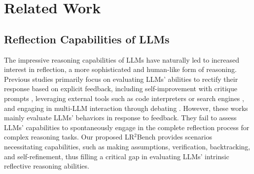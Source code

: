 \section{Related Work}
\subsection{Reflection Capabilities of LLMs}
The impressive reasoning capabilities of LLMs have naturally led to increased interest in reflection, a more sophisticated and human-like form of reasoning. Previous studies primarily focus on evaluating LLMs' abilities to rectify their response based on explicit feedback, including self-improvement with critique prompts \citep{lan2024criticeval, li2024reflection, lin-etal-2024-criticbench, li2024hindsight, madaan2024self}, leveraging external tools such as code interpreters or search engines \citep{gou2024critic, chen2024teaching, shinn2024reflexion}, and engaging in multi-LLM interaction through debating \citep{liang-etal-2024-encouraging, huang2024large}. However, these works mainly evaluate LLMs' behaviors in response to feedback. They fail to assess LLMs' capabilities to spontaneously engage in the complete reflection process for complex reasoning tasks. Our proposed LR$^2$Bench provides scenarios necessitating capabilities, such as making assumptions, verification, backtracking, and self-refinement, thus filling a critical gap in evaluating LLMs' intrinsic reflective reasoning abilities.

